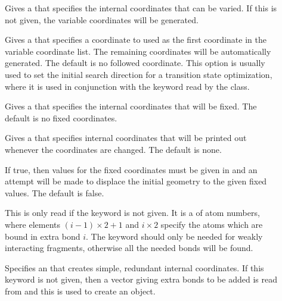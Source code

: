 \begin{description}
  \item[] Gives a 
     that specifies the internal coordinates
    that can be varied. If this is not given, the variable coordinates will
    be generated.

  \item[] Gives a 
     that specifies a coordinate to used as the
    first coordinate in the variable coordinate list.  The remaining
    coordinates will be automatically generated.  The default is no
    followed coordinate.  This option is usually used to set the initial
    search direction for a transition state optimization, where it is used
    in conjunction with the  keyword read by the
     class.

  \item[] Gives a 
     that specifies the internal coordinates
    that will be fixed.  The default is no fixed coordinates.

  \item[] Gives a 
     that specifies internal coordinates
    that will be printed out whenever the coordinates are changed.
    The default is none.

  \item[] If true, then values for the fixed
    coordinates must be given in  and an attempt will be made
    to displace the initial geometry to the given fixed values. The default
    is false.

  \item[] This is only read if the 
     keyword is not given.  It is a  of atom
     numbers, where elements $(i-1)\times 2 + 1$ and $i\times 2$ specify
     the atoms which are bound in extra bond $i$.  The 
     keyword should only be needed for weakly interacting fragments,
     otherwise all the needed bonds will be found.

  \item[] Specifies an 
     that creates simple, redundant internal
    coordinates. If this keyword is not given, then a vector giving extra
    bonds to be added is read from  and this is used to
    create an  object.


\end{description}
